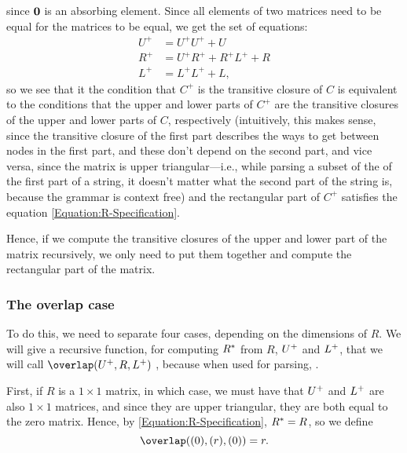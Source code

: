 since $\mathbf{0}$ is an absorbing element. Since all elements of two matrices need to be equal for the matrices to be equal, we get the set of equations:
\begin{align}
  U^+ &= U^+U^+ + U \\
  R^+ &= U^+R^+ + R^+L^+ + R \label{Equation:R-Specification}\\
  L^+ &= L^+L^+ + L,
\end{align}
so we see that it the condition that $C^+$ is the transitive closure of $C$ is equivalent to the conditions that the upper and lower parts of $C^+$ are the transitive closures of the upper and lower parts of $C$, respectively (intuitively, this makes sense, since the transitive closure of the first part describes the ways to get between nodes in the first part, and these don't depend on the second part, and vice versa, since the matrix is upper triangular---i.e., while parsing a subset of the of the first part of a string, it doesn't matter what the second part of the string is, because the grammar is context free) and the rectangular part of $C^+$ satisfies the equation \eqref{Equation:R-Specification}.

Hence, if we compute the transitive closures of the upper and lower part of the matrix recursively, we only need to put them together and compute the rectangular part of the matrix.
\subsubsection{The overlap case}
To do this, we need to separate four cases, depending on the dimensions of $R$. We will give a recursive function, for computing $R^*$ from $R$, $U^+$ and $L^+$, that we will call $\overlap(\tc{U}, R, \tc{L})$ , because when used for parsing, . 

First, if $R$ is a $1 \times 1$ matrix, in which case, we must have that $U^+$ and $L^+$ are also $1 \times 1$ matrices, and since they are upper triangular, they are both equal to the zero matrix. Hence, by \eqref{Equation:R-Specification}, $R^* = R$, so we define 
\begin{equation}
  \label{overlap1}
  \overlap((0), (r), (0)) = r.
\end{equation}

